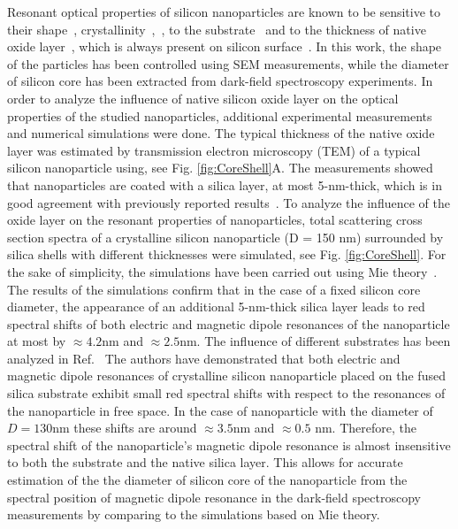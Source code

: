         Resonant optical properties of silicon nanoparticles are known to be sensitive to their shape~\cite{zywietz2015electromagnetic},
        crystallinity~\cite{zywietz2015electromagnetic},~, to the substrate~\cite{miroshnichenko2015substrate} and
        to the thickness of native oxide layer~\cite{zywietz2015electromagnetic, fu2012directional},
        which is always present on silicon surface~\cite{morita1990growth}. In this work, the shape of the particles has been controlled using
        SEM measurements, while the diameter of silicon core has been extracted from dark-field spectroscopy experiments.
        In order to analyze the influence of native silicon oxide layer on the optical properties of the studied nanoparticles,
        additional experimental measurements and numerical simulations were done. The typical thickness of the native oxide layer was
        estimated by transmission electron microscopy (TEM) of a typical silicon nanoparticle using, see Fig. \ref{fig:CoreShell}A.
        The measurements showed that nanoparticles are coated with a silica layer, at most 5-nm-thick, which is in good agreement
        with previously reported results~\cite{zywietz2015electromagnetic, fu2012directional}. To analyze the influence of the oxide
        layer on the resonant properties of nanoparticles,
        total scattering cross section spectra of a crystalline silicon nanoparticle (D = 150 nm) surrounded by
        silica shells with different thicknesses were simulated, see Fig. \ref{fig:CoreShell}. For the sake of simplicity, the simulations have been carried out
        using Mie theory~\cite{bohren1983absorption}. The results of the simulations confirm that in the case of a fixed silicon core diameter, the appearance of an additional
        5-nm-thick silica layer leads to red spectral shifts of both electric and magnetic dipole resonances of the
        nanoparticle at most by $≈ 4.2$nm and $≈ 2.5$nm. The influence of different substrates has been analyzed in
        Ref.~\cite{miroshnichenko2015substrate} The authors have demonstrated that both electric and magnetic dipole resonances of
        crystalline silicon nanoparticle
        placed on the fused silica substrate exhibit small red spectral shifts with respect to the resonances of the nanoparticle
        in free space. In the case of nanoparticle with the diameter of $D = 130 $nm these shifts are around $≈ 3.5 $nm and $≈ 0.5$ nm.
        Therefore, the spectral shift of the nanoparticle’s magnetic dipole resonance is almost insensitive to both
        the substrate and the native silica layer. This allows for accurate estimation of the the diameter of silicon core of the nanoparticle
        from the spectral position of magnetic dipole resonance in the dark-field spectroscopy measurements by
        comparing to the simulations based on Mie theory.


